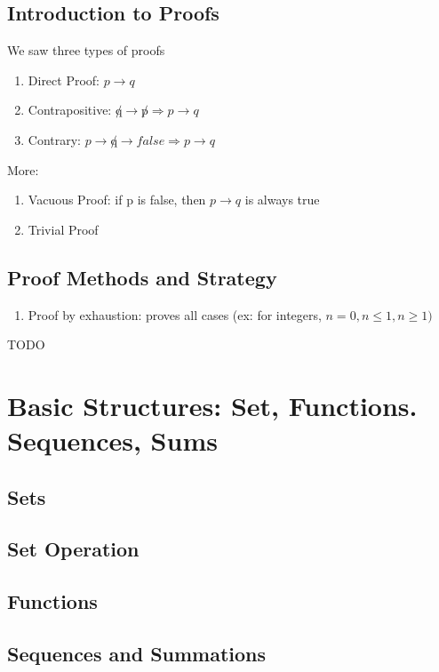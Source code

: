 \documentclass{article}
\begin{document}
\subsection{Introduction to Proofs}

We saw three types of proofs

\begin{enumerate}
    \item Direct Proof: $ p \to q $
    \item Contrapositive: $ \not q \to \not p \Longrightarrow p \to q$
    \item Contrary: $ p \to \not q \rightarrow false \Longrightarrow
	p \to q $
\end{enumerate}

More:
\begin{enumerate}
    \item Vacuous Proof: if p is false, then $ p \to q$ is always true
    \item Trivial Proof
\end{enumerate}

\subsection{Proof Methods and Strategy}

\begin{enumerate}
    \item Proof by exhaustion: proves all cases (ex: for integers, $ n =0,
	n \leq 1, n \geq 1) $
\end{enumerate}

TODO

\section{Basic Structures: Set, Functions. Sequences, Sums}


\subsection{Sets}
\subsection{Set Operation}
\subsection{Functions}
\subsection{Sequences and Summations}
\end{document}
